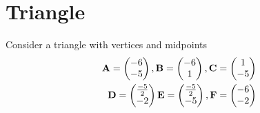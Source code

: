 \documentclass[11pt]{book}
\begin{document}
\tableofcontents
\setcounter{page}{0}
\mainmatter

\chapter{Triangle}

Consider a triangle with vertices and midpoints      \begin{align}                                        \mathbf{A} = \begin{pmatrix}-6 \\ -5\end{pmatrix},                    \mathbf{B} = \begin{pmatrix}-6 \\ 1\end{pmatrix},
\mathbf{C} = \begin{pmatrix}1 \\ -5\end{pmatrix}\\                         \mathbf{D} = \begin{pmatrix}\frac{-5}{2} \\ -2\end{pmatrix}
\mathbf{E} = \begin{pmatrix}\frac{-5}{2} \\ -5\end{pmatrix},
\mathbf{F} = \begin{pmatrix}-6 \\ -2\end{pmatrix}
\end{align}
\end{document}
